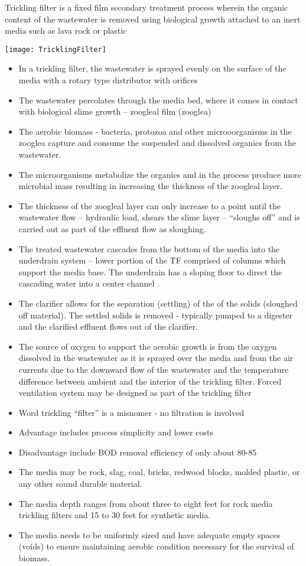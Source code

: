 Trickling filter is a fixed film secondary treatment process wherein the organic content of the wastewater is removed using biological growth attached to an inert media such as lava rock or plastic\\
\begin{center}
\texttt{[image: TricklingFilter]}
\end{center}		
\begin{itemize}
\item In a trickling filter, the wastewater is sprayed evenly on the surface of the media with a rotary type distributor with orifices
\item The wastewater percolates through the media bed, where it comes in contact with biological slime growth – zoogleal film (zooglea)
\item The aerobic biomass - bacteria, protozoa and other microoorganisms in the zooglea capture and consume the suspended and dissolved organics from the wastewater.
\item The microorganisms metabolize the organics and in the process produce more microbial mass resulting in increasing the thickness of the zoogleal layer.
\item The thickness of the zoogleal layer can only increase to a point until the wastewater flow – hydraulic load, shears the slime layer – “sloughs off” and is carried out as part of the effluent flow as sloughing.
\item The treated wastewater cascades from the bottom of the media into the underdrain system – lower portion of the TF comprised of columns which support the media base.  The underdrain has a sloping floor to direct the cascading water into a center channel .
\item The clarifier allows for the separation (settling) of the  of the solids (sloughed off material).  The settled solids is removed - typically pumped to a digester and the clarified effluent flows out of the clarifier.
\item The source of oxygen to support the aerobic growth is from the oxygen dissolved in the wastewater as it is sprayed over the media and from the air currents due to the downward flow of the wastewater and the temperature difference between ambient and the interior of the trickling filter.  Forced ventilation system may be designed as part of the trickling filter

\item Word trickling “filter” is a misnomer - no filtration is involved
\item Advantage includes process simplicity and lower costs
\item Disadvantage include BOD removal efficiency of only about 80-85%
\item The media may be rock, slag, coal, bricks, redwood blocks, molded plastic, or any other sound durable material.
\item The media depth ranges from about three to eight feet for rock media trickling filters and 15 to 30 feet for synthetic media.
\item The media needs to be uniformly sized and have adequate empty spaces (voids) to ensure maintaining aerobic condition necessary for the survival of biomass.  


\end{itemize}
